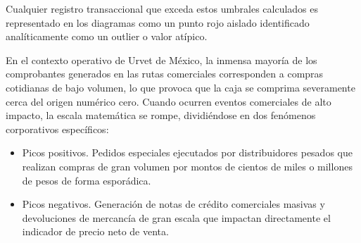 \documentclass[11pt,a4paper]{report}
\begin{document}
        Cualquier registro transaccional que exceda estos umbrales calculados es representado en los diagramas como un punto
        rojo aislado identificado anal\'iticamente como un outlier o valor at\'ipico. 

        En el contexto operativo de Urvet de M\'exico, la inmensa mayor\'ia de los comprobantes generados
        en las rutas comerciales corresponden a compras cotidianas de bajo volumen, lo que provoca que la caja se comprima
        severamente cerca del origen num\'erico cero. Cuando ocurren eventos comerciales de alto impacto, la escala matem\'atica se rompe,
        dividi\'endose en dos fen\'omenos corporativos espec\'ificos:
        \begin{itemize}
            \item Picos positivos. Pedidos especiales ejecutados por distribuidores pesados que realizan compras de gran volumen por montos
            de cientos de miles o millones de pesos de forma espor\'adica.
            \item Picos negativos. Generaci\'on de notas de cr\'edito comerciales masivas y devoluciones de mercanc\'ia de gran escala que
            impactan directamente el indicador de precio neto de venta.
        \end{itemize}
\end{document}

